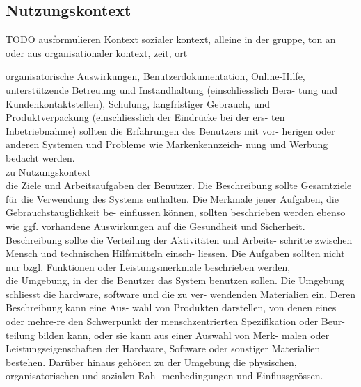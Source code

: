 
\subsection{Nutzungskontext}
TODO ausformulieren
 Kontext sozialer kontext, alleine in der gruppe, ton an oder aus
 organisationaler kontext, zeit, ort

organisatorische Auswirkungen, Benutzerdokumentation, Online-Hilfe, unterstützende Betreuung und Instandhaltung (einschliesslich Bera- tung und Kundenkontaktstellen), Schulung, langfristiger Gebrauch, und Produktverpackung (einschliesslich der Eindrücke bei der ers- ten Inbetriebnahme) sollten die Erfahrungen des Benutzers mit vor- herigen oder anderen Systemen und Probleme wie Markenkennzeich- nung und Werbung bedacht werden.\\

zu Nutzungskontext\\
die Ziele und Arbeitsaufgaben der Benutzer. Die Beschreibung sollte Gesamtziele für die Verwendung des Systems enthalten. Die Merkmale jener Aufgaben, die Gebrauchstauglichkeit be- einflussen können, sollten beschrieben werden ebenso wie ggf. vorhandene Auswirkungen auf die Gesundheit und Sicherheit. Beschreibung sollte die Verteilung der Aktivitäten und Arbeits- schritte zwischen Mensch und technischen Hilfsmitteln einsch- liessen. Die Aufgaben sollten nicht nur bzgl. Funktionen oder Leistungsmerkmale beschrieben werden,\\

die Umgebung, in der die Benutzer das System benutzen sollen. Die Umgebung schliesst die hardware, software und die zu ver- wendenden Materialien ein. Deren Beschreibung kann eine Aus- wahl von Produkten darstellen, von denen eines oder mehre-re den Schwerpunkt der menschzentrierten Spezifikation oder Beur- teilung bilden kann, oder sie kann aus einer Auswahl von Merk- malen oder Leistungseigenschaften der Hardware, Software oder sonstiger Materialien bestehen. Darüber hinaus gehören zu der Umgebung die physischen, organisatorischen und sozialen Rah- menbedingungen und Einflussgrössen.\\

